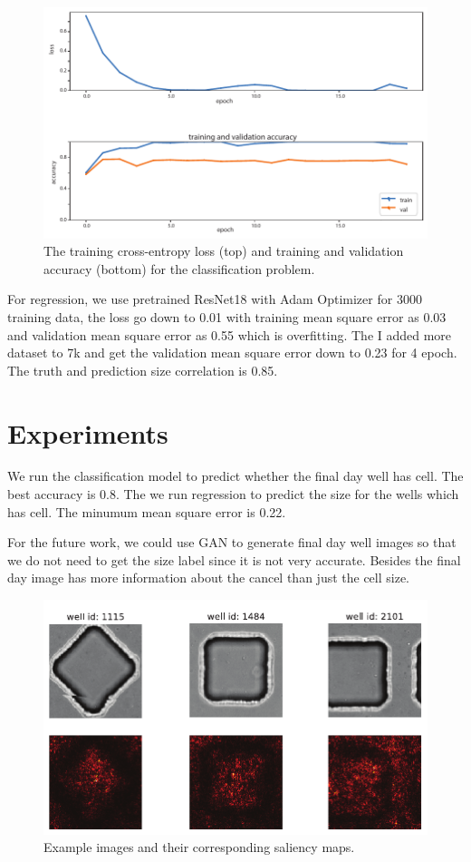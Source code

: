 \documentclass[10pt,twocolumn,letterpaper]{article}
\begin{document}
 \begin{figure}[t!]
\begin{center}
\includegraphics[width=0.8\linewidth]{figures/classification/classification_train_loss_train_and_val_loss.pdf}
\end{center}
   \caption{The training cross-entropy loss (top) and training and validation accuracy (bottom) for the classification problem.}
\label{classification_train_loss_train_and_val_loss}
\end{figure}



For regression, we use pretrained ResNet18 with Adam Optimizer for 3000 training data, the loss go down to 0.01 with training mean square error as 0.03 and validation mean square error as 0.55 which is overfitting. The I added more dataset to 7k and get the validation mean square error down to 0.23 for 4 epoch. The truth and prediction size correlation is 0.85. 



 \section{Experiments}
 We run the classification model to predict whether the final day well has cell. The best accuracy is 0.8. The we run regression to predict the size for the wells which has cell. The minumum mean square error is 0.22. 

For the future work, we could use GAN to generate final day well images so that we do not need to get the size label since it is not very accurate. Besides the final day image has more information about the cancel than just the cell size. 






 \begin{figure}[t!]
\begin{center}
 \includegraphics[width=0.9\linewidth]{figures/saliency_maps.pdf}
\end{center}
   \caption{Example images and their corresponding saliency maps.}
\label{saliency_maps}
\end{figure}



{\small


}
\end{document}
